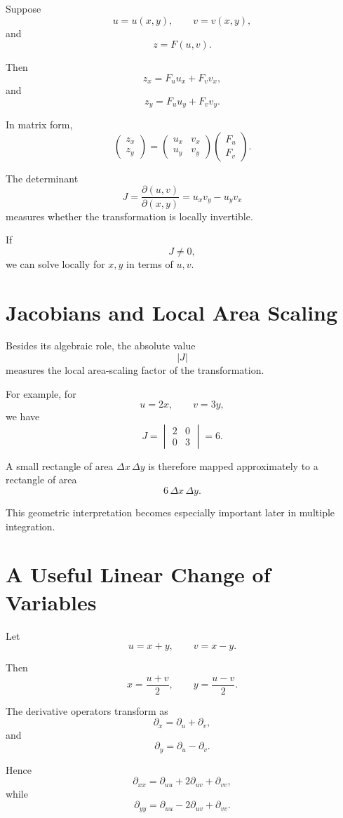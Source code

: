 \documentclass[11pt,oneside]{book}
\theoremstyle{studentthm}
\theoremstyle{definition}
\begin{document}
Suppose
\[
u=u(x,y),
\qquad
v=v(x,y),
\]
and
\[
z=F(u,v).
\]

Then
\[
z_x=F_u u_x+F_v v_x,
\]
and
\[
z_y=F_u u_y+F_v v_y.
\]

In matrix form,
\[
\begin{pmatrix}
z_x\\
z_y
\end{pmatrix}
=
\begin{pmatrix}
u_x&v_x\\
u_y&v_y
\end{pmatrix}
\begin{pmatrix}
F_u\\
F_v
\end{pmatrix}.
\]

The determinant
\[
J
=
\frac{\partial(u,v)}{\partial(x,y)}
=
u_xv_y-u_yv_x
\]
measures whether the transformation is locally invertible.

If
\[
J\ne0,
\]
we can solve locally for \(x,y\) in terms of \(u,v\).

\section{Jacobians and Local Area Scaling}

Besides its algebraic role, the absolute value
\[
|J|
\]
measures the local area-scaling factor of the transformation.

For example, for
\[
u=2x,\qquad v=3y,
\]
we have
\[
J
=
\begin{vmatrix}
2&0\\
0&3
\end{vmatrix}
=6.
\]

A small rectangle of area \(\Delta x\,\Delta y\) is therefore mapped
approximately to a rectangle of area
\[
6\,\Delta x\,\Delta y.
\]

This geometric interpretation becomes especially important later in
multiple integration.

\section{A Useful Linear Change of Variables}

Let
\[
u=x+y,\qquad v=x-y.
\]

Then
\[
x=\frac{u+v}{2},
\qquad
y=\frac{u-v}{2}.
\]

The derivative operators transform as
\[
\partial_x=\partial_u+\partial_v,
\]
and
\[
\partial_y=\partial_u-\partial_v.
\]

Hence
\[
\partial_{xx}
=
\partial_{uu}
+
2\partial_{uv}
+
\partial_{vv},
\]
while
\[
\partial_{yy}
=
\partial_{uu}
-
2\partial_{uv}
+
\partial_{vv}.
\]
\end{document}
